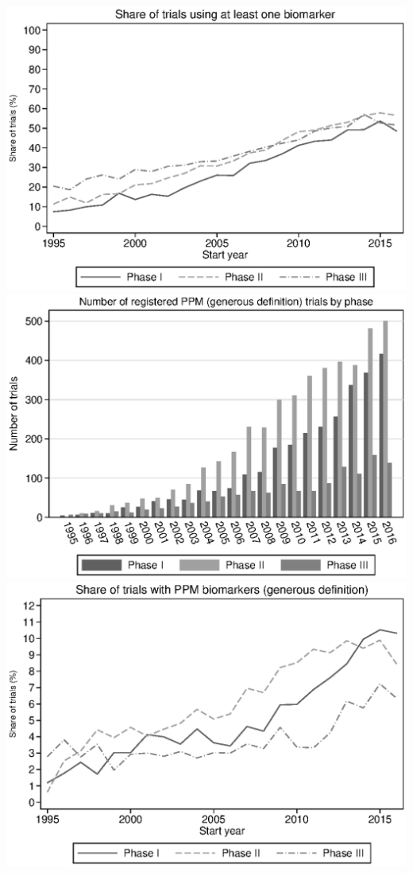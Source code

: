 \includegraphics{../figures/02b-bmkr_share_by_phase.eps}
\includegraphics{../figures/03a-g_ppm_count_by_phase.eps}
\includegraphics{../figures/03b-g_ppm_share_by_phase.eps}
